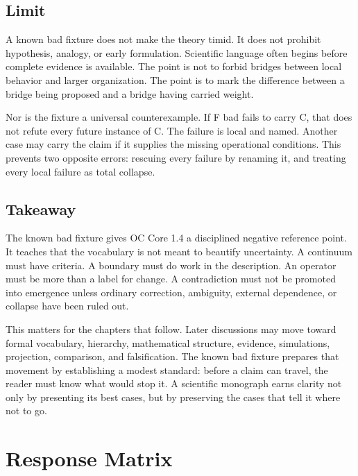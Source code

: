 \documentclass[11pt,a4paper,openany]{book}
\begin{document}
\subsection{Limit}
A known bad fixture does not make the theory timid. It does not prohibit hypothesis, analogy, or early formulation. Scientific language often begins before complete evidence is available. The point is not to forbid bridges between local behavior and larger organization. The point is to mark the difference between a bridge being proposed and a bridge having carried weight. \cite{haken_synergetics,nicolis_prigogine_selforg}\par
Nor is the fixture a universal counterexample. If F bad fails to carry C, that does not refute every future instance of C. The failure is local and named. Another case may carry the claim if it supplies the missing operational conditions. This prevents two opposite errors: rescuing every failure by renaming it, and treating every local failure as total collapse.\par
\subsection{Takeaway}
The known bad fixture gives OC Core 1.4 a disciplined negative reference point. It teaches that the vocabulary is not meant to beautify uncertainty. A continuum must have criteria. A boundary must do work in the description. An operator must be more than a label for change. A contradiction must not be promoted into emergence unless ordinary correction, ambiguity, external dependence, or collapse have been ruled out. \cite{haken_synergetics,nicolis_prigogine_selforg}\par
This matters for the chapters that follow. Later discussions may move toward formal vocabulary, hierarchy, mathematical structure, evidence, simulations, projection, comparison, and falsification. The known bad fixture prepares that movement by establishing a modest standard: before a claim can travel, the reader must know what would stop it. A scientific monograph earns clarity not only by presenting its best cases, but by preserving the cases that tell it where not to go.\par
\section{Response Matrix}
\end{document}
